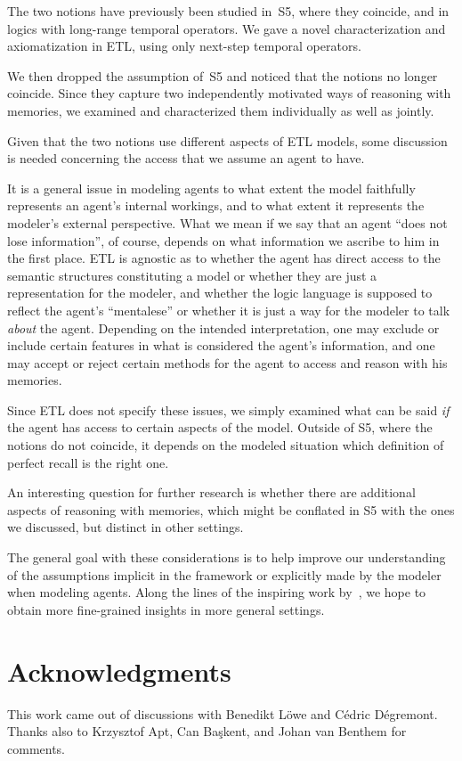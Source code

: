\documentclass{article}
\newcounter{#1}
\begin{document}
The two notions have previously been studied in~S5, where they coincide,
and in logics with long-range temporal operators.
We gave a novel characterization and axiomatization in ETL,
using only next-step temporal operators.

We then dropped the assumption of~S5
and noticed that the notions no longer coincide.
Since they capture two independently motivated ways of reasoning with memories,
we examined and characterized them individually as well as jointly.

\medskip

Given that the two notions use different aspects of ETL models,
some discussion is needed concerning the access that we assume an agent to have.

It is a general issue in modeling agents
to what extent the model faithfully represents an agent's internal workings,
and to what extent it represents the modeler's external perspective.
What we mean if we say that an agent ``does not lose information'', of course,
depends on what information we ascribe to him in the first place.
ETL is agnostic as to whether the agent has direct access to the semantic structures constituting a model
or whether they are just a representation for the modeler,
and whether the logic language is supposed to reflect the agent's ``mentalese''
or whether it is just a way for the modeler to talk \emph{about} the agent.
Depending on the intended interpretation,
one may exclude or include certain features in what is considered the agent's information,
and one may accept or reject certain methods for the agent to access and reason with his memories.

Since ETL does not specify these issues,
we simply examined what can be said \emph{if} the agent has access to certain aspects of the model.
Outside of S5, where the notions do not coincide,
it depends on the modeled situation
which definition of perfect recall is the right one.

\medskip

An interesting question for further research is
whether there are additional aspects of reasoning with memories,
which might be conflated in S5 with the ones we discussed, but distinct in other settings.

\medskip

The general goal with these considerations is
to help improve our understanding of
the assumptions implicit in the framework or explicitly made by the modeler when modeling agents.
Along the lines of the inspiring work by~\citet{van_benthem_merging_2009},
we hope to obtain more fine-grained insights in more general settings.

\section*{Acknowledgments}
\label{sec:acknowledgments}

This work came out of discussions with Benedikt Löwe and Cédric Dégremont.
Thanks also to Krzysztof Apt, Can Başkent, and Johan van Benthem for comments.




\end{document}
